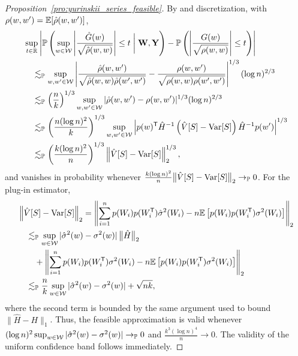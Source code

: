 \begin{proof}[Proposition~\ref{pro:yurinskii_series_feasible}]
  By \citet[Lemma~3.1]{chernozhukov2013gaussian} and discretization,
  with $\rho(w,w') = \mathbb{E}[\hat\rho(w,w')]$,
  \begin{align*}
    &\sup_{t \in \mathbb{R}}
    \left|
    \mathbb{P}\left(
      \sup_{w \in \mathcal{W}}
      \left|
      \frac{\hat G(w)}{\sqrt{\hat\rho(w,w)}}
      \right|
      \leq t \biggm| \mathbf{W}, \mathbf{Y}
    \right)
    - \mathbb{P}\left(
      \left|
      \frac{G(w)}{\sqrt{\rho(w,w)}}
      \right|
      \leq t
    \right)
    \right| \\
    &\quad\lesssim_{\mathbb{P}}
    \sup_{w,w' \in \mathcal{W}}
    \left|
    \frac{\hat\rho(w,w')}
    {\sqrt{\hat\rho(w,w)\hat\rho(w',w')}}
    - \frac{\rho(w,w')}
    {\sqrt{\rho(w,w)\rho(w',w')}}
    \right|^{1/3}
    (\log n)^{2/3} \\
    &\quad\lesssim_{\mathbb{P}}
    \left(\frac n k \right)^{1/3}
    \sup_{w,w' \in \mathcal{W}} |\hat\rho(w,w') - \rho(w,w')|^{1/3}
    (\log n)^{2/3} \\
    &\quad\lesssim_{\mathbb{P}}
    \left( \frac{n (\log n)^2}{k} \right)^{1/3}
    \sup_{w,w' \in \mathcal{W}}
    \left|
    p(w)^{\mathsf{T}} \hat H^{-1}
    \left(
      \hat{V}[S]
      - \operatorname{Var}[S]
    \right)
    \hat H^{-1} p(w')
    \right|^{1/3} \\
    &\quad\lesssim_{\mathbb{P}}
    \left( \frac{k (\log n)^2}{n} \right)^{1/3}
    \left\|
    \hat{V}[S]
    - \operatorname{Var}[S]
    \right\|_2^{1/3},
  \end{align*}
  and vanishes in probability whenever
  $\frac{k (\log n)^2}{n}
  \big\| \hat{V}[S] - \operatorname{Var}[S] \big\|_2 \to_{\mathbb{P}} 0$.
  For the plug-in estimator,
  \begin{align*}
    &\left\|
    \hat{V}[S]
    - \operatorname{Var}[S]
    \right\|_2
    =
    \left\|
    \sum_{i=1}^n
    p(W_i) p(W_i^{\mathsf{T}})
    \hat\sigma^2(W_i)
    - n \mathbb{E}\left[
      p(W_i) p(W_i^{\mathsf{T}})
      \sigma^2(W_i)
    \right]
    \right\|_2 \\
    &\quad\lesssim_{\mathbb{P}}
    \sup_{w \in \mathcal{W}}
    |\hat{\sigma}^2(w)-\sigma^2(w)|
    \, \big\| \hat H \big\|_2 \\
    &\qquad+
    \left\|
    \sum_{i=1}^n
    p(W_i) p(W_i^{\mathsf{T}})
    \sigma^2(W_i)
    - n \mathbb{E}\left[
      p(W_i) p(W_i^{\mathsf{T}})
      \sigma^2(W_i)
    \right]
    \right\|_2 \\
    &\quad\lesssim_{\mathbb{P}}
    \frac{n}{k}
    \sup_{w \in \mathcal{W}}
    |\hat{\sigma}^2(w)-\sigma^2(w)|
    + \sqrt{n k},
  \end{align*}
  where the second term is bounded by the same argument
  used to bound $\|\hat H - H\|_1$.
  Thus, the feasible approximation is valid whenever
  $(\log n)^2 \sup_{w \in \mathcal{W}}
  |\hat{\sigma}^2(w)-\sigma^2(w)| \to_{\mathbb{P}} 0$
  and $\frac{k^3 (\log n)^4}{n} \to 0$.
  The validity of the uniform confidence band follows immediately.
\end{proof}

